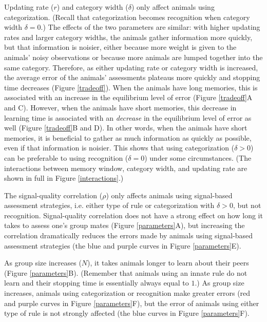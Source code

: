 Updating rate ($r$) and category width ($\delta$) only affect animals using categorization. (Recall that categorization becomes recognition when category width $\delta=0$.) The effects of the two parameters are similar: with higher updating rates and larger category widths, the animals gather information more quickly, but that information is noisier, either because more weight is given to the animals' noisy observations or because more animals are lumped together into the same category. Therefore, as either updating rate or category width is increased, the average error of the animals' assessments plateaus more quickly and stopping time decreases (Figure \ref{tradeoff}). When the animals have long memories, this is associated with an increase in the equilibrium level of error (Figure \ref{tradeoff}A and C). However, when the animals have short memories, this decrease in learning time is associated with an \emph{decrease} in the equilibrium level of error as well (Figure \ref{tradeoff}B and D). In other words, when the animals have short memories, it is beneficial to gather as much information as quickly as possible, even if that information is noisier. This shows that using categorization ($\delta>0$) can be preferable to using recognition ($\delta=0$) under some circumstances. (The interactions between memory window, category width, and updating rate are shown in full in Figure \ref{interactions}.)

The signal-quality correlation ($\rho$) only affects animals using signal-based assessment strategies, i.e. either type of rule or categorization with $\delta>0$, but not recognition. Signal-quality correlation does not have a strong effect on how long it takes to assess one's group mates (Figure \ref{parameters}A), but increasing the correlation dramatically reduces the errors made by animals using signal-based assessment strategies (the blue and purple curves in Figure \ref{parameters}E).

As group size increases ($N$), it takes animals longer to learn about their peers (Figure \ref{parameters}B). (Remember that animals using an innate rule do not learn and their stopping time is essentially always equal to $1$.) As group size increases, animals using categorization or recognition make greater errors (red and purple curves in Figure \ref{parameters}F), but the error of animals using either type of rule is not strongly affected (the blue curves in Figure \ref{parameters}F).

